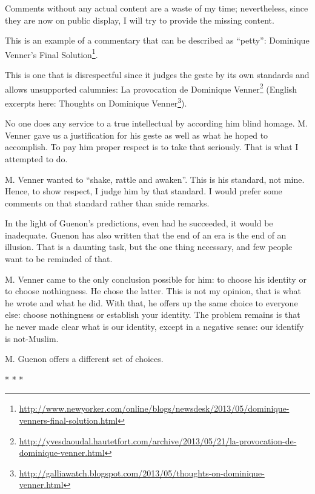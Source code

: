 Comments without any actual content are a waste of my time; nevertheless, since they are now on public display, I will try to provide the missing content.

This is an example of a commentary that can be described as ``petty'': Dominique Venner's Final Solution\footnote{\url{http://www.newyorker.com/online/blogs/newsdesk/2013/05/dominique-venners-final-solution.html}}.

This is one that is disrespectful since it judges the geste by its own standards and allows unsupported calumnies: La provocation de Dominique Venner\footnote{\url{http://yvesdaoudal.hautetfort.com/archive/2013/05/21/la-provocation-de-dominique-venner.html}} (English excerpts here: Thoughts on Dominique Venner\footnote{\url{http://galliawatch.blogspot.com/2013/05/thoughts-on-dominique-venner.html}}).

No one does any service to a true intellectual by according him blind homage. M. Venner gave us a justification for his geste as well as what he hoped to accomplish. To pay him proper respect is to take that seriously. That is what I attempted to do.

M. Venner wanted to ``shake, rattle and awaken''. This is his standard, not mine. Hence, to show respect, I judge him by that standard. I would prefer some comments on that standard rather than snide remarks.

In the light of Guenon's predictions, even had he succeeded, it would be inadequate. Guenon has also written that the end of an era is the end of an illusion. That is a daunting task, but the one thing necessary, and few people want to be reminded of that.

M. Venner came to the only conclusion possible for him: to choose his identity or to choose nothingness. He chose the latter. This is not my opinion, that is what he wrote and what he did. With that, he offers up the same choice to everyone else: choose nothingness or establish your identity. The problem remains is that he never made clear what is our identity, except in a negative sense: our identify is not-Muslim.

M. Guenon offers a different set of choices.



\begin{center}* * *\end{center}

